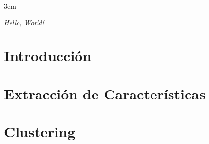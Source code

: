 


    \emergencystretch 3em

    \frontmatter



    \begin{flushright}
        \thispagestyle{empty}
        \emph{Hello, World!}
    \end{flushright}



    \chapter*{Introducción}\label{ch:introduction}
    

    \mainmatter

    \chapter{Extracción de Características}\label{ch:features}
    


    \chapter{Clustering}\label{ch:clustering}
    


